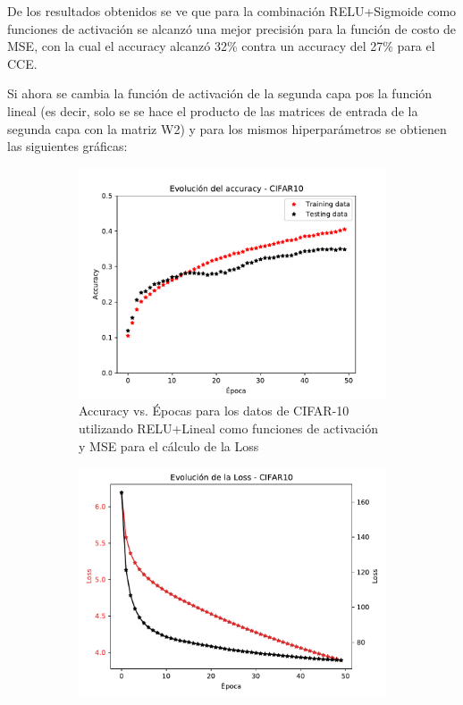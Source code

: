 De los resultados obtenidos se ve que para la combinación RELU+Sigmoide como funciones de activación se alcanzó una mejor precisión para la función de costo de MSE, con la cual el accuracy alcanzó 32\% contra un accuracy del 27\% para el CCE.

Si ahora se cambia la función de activación de la segunda capa pos la función lineal (es decir, solo se se hace el producto de las matrices de entrada de la segunda capa con la matriz W2) y para los mismos hiperparámetros se obtienen las siguientes gráficas:



\begin{figure}[H]
     \centering
     \begin{subfigure}[b]{0.45\textwidth}
         \centering
         \includegraphics[width=\textwidth]{image/EJ5_Acc_RELU_LIN_MSE.pdf}
         \caption{Accuracy vs. Épocas para los datos de CIFAR-10 utilizando RELU+Lineal como funciones de activación y MSE para el cálculo de la Loss}
         \label{fig:acc6a}
     \end{subfigure}
     \hfill
     \begin{subfigure}[b]{0.45\textwidth}
         \centering
         \includegraphics[width=\textwidth]{image/EJ5_Loss_RELU_LIN_MSE.pdf}

\end{subfigure}
\end{figure}
